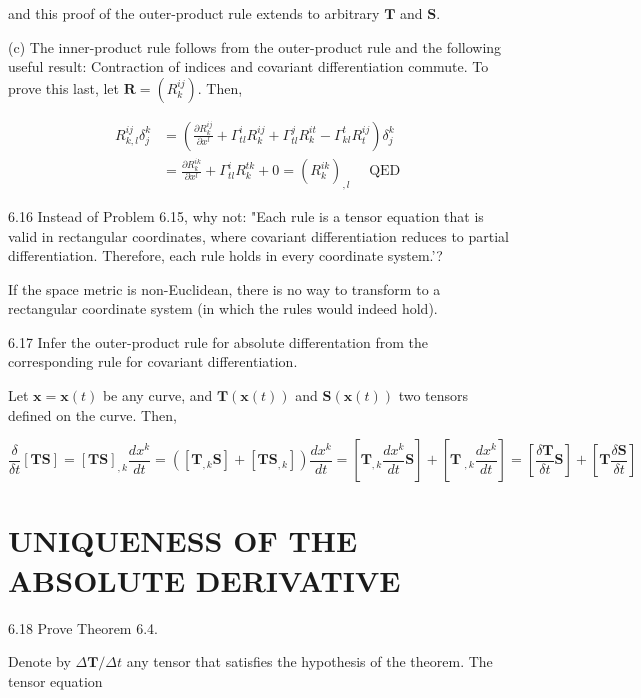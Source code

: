 \documentclass[10pt]{article}
\begin{document}
and this proof of the outer-product rule extends to arbitrary $\mathbf{T}$ and $\mathbf{S}$.

(c) The inner-product rule follows from the outer-product rule and the following useful result: Contraction of indices and covariant differentiation commute. To prove this last, let $\mathbf{R}=\left(R_{k}^{i j}\right)$. Then,

$$
\begin{aligned}
R_{k, l}^{i j} \delta_{j}^{k} & =\left(\frac{\partial R_{k}^{i j}}{\partial x^{l}}+\Gamma_{t l}^{i} R_{k}^{i j}+\Gamma_{t l}^{j} R_{k}^{i t}-\Gamma_{k l}^{t} R_{t}^{i j}\right) \delta_{j}^{k} \\
& =\frac{\partial R_{k}^{i k}}{\partial x^{l}}+\Gamma_{t l}^{i} R_{k}^{t k}+0=\left(R_{k}^{i k}\right)_{, l} \quad \text { QED }
\end{aligned}
$$

6.16 Instead of Problem 6.15, why not: "Each rule is a tensor equation that is valid in rectangular coordinates, where covariant differentiation reduces to partial differentiation. Therefore, each rule holds in every coordinate system.'?

If the space metric is non-Euclidean, there is no way to transform to a rectangular coordinate system (in which the rules would indeed hold).

6.17 Infer the outer-product rule for absolute differentation from the corresponding rule for covariant differentiation.

Let $\mathbf{x}=\mathbf{x}(t)$ be any curve, and $\mathbf{T}(\mathbf{x}(t))$ and $\mathbf{S}(\mathbf{x}(t))$ two tensors defined on the curve. Then,

$$
\frac{\delta}{\delta t}[\mathbf{T S}]=[\mathbf{T S}]_{, k} \frac{d x^{k}}{d t}=\left(\left[\mathbf{T}_{, k} \mathbf{S}\right]+\left[\mathbf{T S}_{, k}\right]\right) \frac{d x^{k}}{d t}=\left[\mathbf{T}_{, k} \frac{d x^{k}}{d t} \mathbf{S}\right]+\left[\mathbf{T ~}_{, k} \frac{d x^{k}}{d t}\right]=\left[\frac{\delta \mathbf{T}}{\delta t} \mathbf{S}\right]+\left[\mathbf{T} \frac{\delta \mathbf{S}}{\delta t}\right]
$$

\section*{UNIQUENESS OF THE ABSOLUTE DERIVATIVE}
6.18 Prove Theorem 6.4.

Denote by $\Delta \mathbf{T} / \Delta t$ any tensor that satisfies the hypothesis of the theorem. The tensor equation
\end{document}
